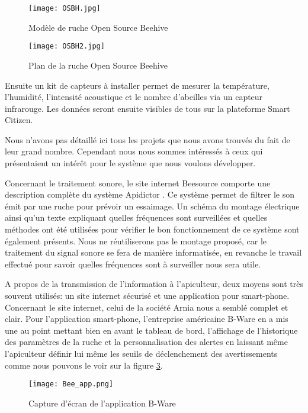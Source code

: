 \begin{figure}[h]
\centering\texttt{[image: OSBH.jpg]}
\caption{\label{fig:OSBH} Modèle de ruche Open Source Beehive}
\end{figure}

\begin{figure}[h]
\centering\texttt{[image: OSBH2.jpg]}
\caption{\label{fig:OSBH2} Plan de la ruche Open Source Beehive}
\end{figure}

Ensuite un kit de capteurs à installer permet de mesurer la température, l'humidité, l'intensité acoustique et le nombre d'abeilles via un capteur infrarouge. Les données seront ensuite visibles de tous sur la plateforme Smart Citizen.

Nous n'avons pas détaillé ici tous les projets que nous avons trouvés du fait de leur grand nombre. Cependant nous nous sommes intéressés à ceux qui présentaient un intérêt pour le système que nous voulons développer. 

Concernant le traitement sonore, le site internet Beesource comporte une description complète du système Apidictor \cite{apidictor}. Ce système permet de filtrer le son émit par une ruche pour prévoir un essaimage. Un schéma du montage électrique ainsi qu'un texte expliquant quelles fréquences sont surveillées et quelles méthodes ont été utilisées pour vérifier le bon fonctionnement de ce système sont également présents. Nous ne réutiliserons pas le montage proposé, car le traitement du signal sonore se fera de manière informatisée, en revanche le travail effectué pour savoir quelles fréquences sont à surveiller nous sera utile.

A propos de la transmission de l'information à l'apiculteur, deux moyens sont très souvent utilisés: un site internet sécurisé et une application pour smart-phone. Concernant le site internet, celui de la société Arnia nous a semblé complet et clair. Pour l'application smart-phone, l'entreprise américaine B-Ware en a mis une au point mettant bien en avant le tableau de bord, l'affichage de l'historique des paramètres de la ruche et la personnalisation des alertes en laissant même l'apiculteur définir lui même les seuils de déclenchement des avertissements comme nous pouvons le voir sur la figure \ref{fig:application}.   

\begin{figure}[h]
\centering\texttt{[image: Bee\_app.png]}
\caption{\label{fig:application} Capture d'écran de l'application B-Ware}
\end{figure} 

